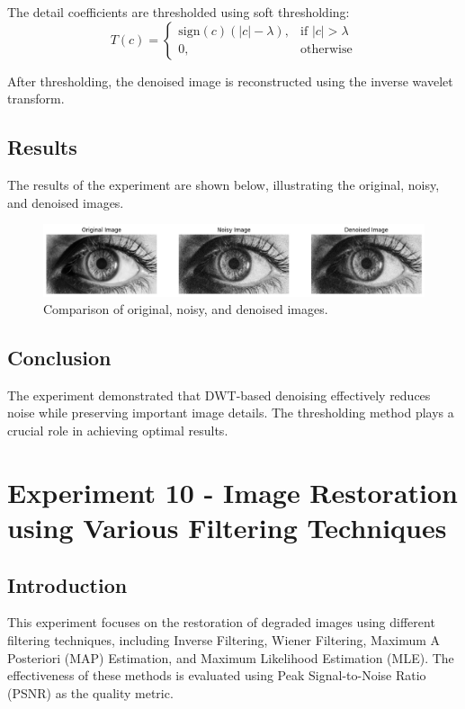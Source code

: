\documentclass{report}
\begin{document}
The detail coefficients are thresholded using soft thresholding:
\begin{equation}
T(c) = 
\begin{cases}
    \text{sign}(c)(|c| - \lambda), & \text{if } |c| > \lambda \\
    0, & \text{otherwise}
\end{cases}
\end{equation}

After thresholding, the denoised image is reconstructed using the inverse wavelet transform.

\section{Results}
The results of the experiment are shown below, illustrating the original, noisy, and denoised images.

\begin{figure}[h]
    \centering
    \includegraphics[width=\textwidth]{images/Exp-9-Results.png}
    \caption{Comparison of original, noisy, and denoised images.}
    \label{fig:denoising_results}
\end{figure}

\section{Conclusion}
The experiment demonstrated that DWT-based denoising effectively reduces noise while preserving important image details. The thresholding method plays a crucial role in achieving optimal results.

\chapter{Experiment 10 - Image Restoration using Various Filtering Techniques}

\section{Introduction}
This experiment focuses on the restoration of degraded images using different filtering techniques, including Inverse Filtering, Wiener Filtering, Maximum A Posteriori (MAP) Estimation, and Maximum Likelihood Estimation (MLE). The effectiveness of these methods is evaluated using Peak Signal-to-Noise Ratio (PSNR) as the quality metric.
\end{document}
